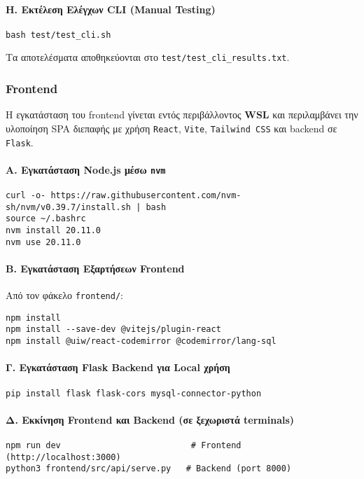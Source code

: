 \documentclass[13pt]{extarticle}
\begin{document}
\paragraph{Η. Εκτέλεση Ελέγχων CLI (Manual Testing)}
\begin{verbatim}
bash test/test_cli.sh
\end{verbatim}

Τα αποτελέσματα αποθηκεύονται στο \texttt{test/test\_cli\_results.txt}.

\clearpage
\subsubsection{Frontend}

Η εγκατάσταση του frontend γίνεται εντός περιβάλλοντος \textbf{WSL} και περιλαμβάνει την υλοποίηση SPA διεπαφής με χρήση \texttt{React}, \texttt{Vite}, \texttt{Tailwind CSS} και backend σε \texttt{Flask}.

\paragraph{Α. Εγκατάσταση Node.js μέσω \texttt{nvm}}
\begin{verbatim}
curl -o- https://raw.githubusercontent.com/nvm-sh/nvm/v0.39.7/install.sh | bash
source ~/.bashrc
nvm install 20.11.0
nvm use 20.11.0
\end{verbatim}

\paragraph{Β. Εγκατάσταση Εξαρτήσεων Frontend}
Από τον φάκελο \texttt{frontend/}:

\begin{verbatim}
npm install
npm install --save-dev @vitejs/plugin-react
npm install @uiw/react-codemirror @codemirror/lang-sql
\end{verbatim}

\paragraph{Γ. Εγκατάσταση Flask Backend για Local χρήση}
\begin{verbatim}
pip install flask flask-cors mysql-connector-python
\end{verbatim}

\paragraph{Δ. Εκκίνηση Frontend και Backend (σε ξεχωριστά terminals)}
\begin{verbatim}
npm run dev                          # Frontend (http://localhost:3000)
python3 frontend/src/api/serve.py   # Backend (port 8000)
\end{verbatim}
\end{document}

